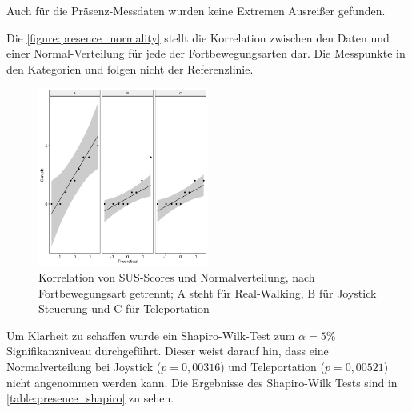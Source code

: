                     Auch für die Präsenz-Messdaten wurden keine Extremen Ausreißer gefunden.

                    Die \autoref{figure:presence_normality} stellt die Korrelation zwischen den Daten und einer Normal-Verteilung für jede der Fortbewegungsarten dar.
                    Die Messpunkte in den Kategorien  und  folgen nicht der Referenzlinie.

                    \begin{figure}[!h]
                        \centering
                        \includegraphics[width=0.5\textwidth]{plots/presence_normality.png}
                        \caption{Korrelation von SUS-Scores und Normalverteilung, nach Fortbewegungsart getrennt;  A steht für Real-Walking, B für Joystick Steuerung und C für Teleportation }\label{figure:presence_normality}
                    \end{figure}

                    Um Klarheit zu schaffen wurde ein Shapiro-Wilk-Test zum $\alpha = 5\%$ Signifikanzniveau durchgeführt. Dieser weist darauf hin, dass eine Normalverteilung bei Joystick ($p = 0,00316$) und Teleportation ($p = 0,00521$) nicht angenommen werden kann. Die Ergebnisse des Shapiro-Wilk Tests sind in \autoref{table:presence_shapiro} zu sehen.

